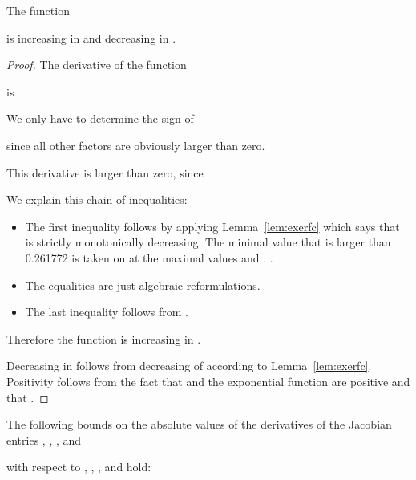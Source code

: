 \documentclass{article}
\begin{document}
\begin{lemma}[Function ]
\label{lem:F8}

The function 

is increasing in  and decreasing in .
\end{lemma}
\begin{proof}
The derivative of the function

is

We only have to determine the sign of
 
since all other factors are obviously larger than zero.

This derivative is larger than zero, since

We explain this chain of inequalities:
\begin{itemize}
\item The first inequality follows by applying Lemma~\ref{lem:exerfc}
  which says that  
is strictly monotonically decreasing. The minimal value that is larger
than 0.261772 is taken on at
the maximal values  and . 
.
\item The equalities are just algebraic reformulations.
\item The last inequality follows from
.
\end{itemize}
Therefore the function is increasing in  .

Decreasing in  follows from decreasing of 
according to Lemma~\ref{lem:exerfc}.
Positivity follows from the fact that  and the
exponential function are positive and that  . 
\end{proof}




\begin{lemma}
\label{proof:Bounds}
The following bounds on the absolute values of the 
derivatives of the Jacobian entries ,
,
, and

with respect to 
, , , and  hold:




\end{lemma}
\end{document}
